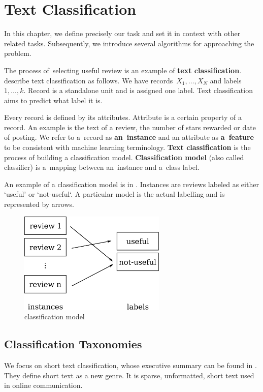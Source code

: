 \chapter{Text Classification}\label{chap:cls}

In this chapter, we define precisely our task and set it in context with other related tasks.
Subsequently, we introduce several algorithms for approaching the problem.

The process of~selecting useful review is an example of {\bf text classification}.
\citet{AggZhai12} describe text classification as follows.
We have records~$X_1, \ldots, X_N$ and labels~$1,\ldots, k$.
Record is a standalone unit and is assigned one label.
Text classification aims to predict what label it is.

Every record is defined by its attributes.
Attribute is a certain property of a record.
An example is the text of a review, the number of stars rewarded or date of posting.
We refer to a~record as \textbf{an~instance} and an attribute as \textbf{a~feature} to be consistent with machine learning terminology.
{\bf Text classification} is the process of building a classification model.
{\bf Classification model} (also called classifier) is a~mapping between an~instance and a~class label.

An example of a classification model is in .
Instances are reviews labeled as either `useful' or `not-useful`.
A particular model is the actual labelling and is represented by arrows.

\begin{figure}[h]
	\centering
	\includegraphics[width=7cm]{figures/model.eps}
	\caption{classification model} \label{fig:cls_model}
\end{figure}


\section{Classification Taxonomies}

We focus on short text classification, whose
executive summary can be found in \citet{Song14}.
They define short text as a new genre.
It is sparse, unformatted, short text used in online communication.


